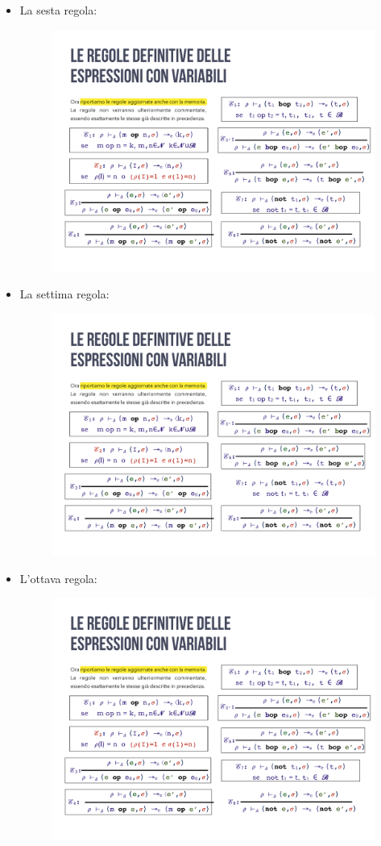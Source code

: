 \documentclass[a4paper]{article}
\begin{document}
\begin{itemize}
 		\item La sesta regola:
 		\begin{figure}[!htp]
 			\centering
 			\includegraphics[width=.7\textwidth]{img/regola_espressione-up-6.pdf}
 		\end{figure}
 		
 		\item La settima regola:
 		\begin{figure}[!htp]
 			\centering
 			\includegraphics[width=.7\textwidth]{img/regola_espressione-up-7.pdf}
 		\end{figure}
 		
 		\item L'ottava regola:
 		\begin{figure}[!htp]
 			\centering
 			\includegraphics[width=.7\textwidth]{img/regola_espressione-up-8.pdf}
 		\end{figure}
 	\end{itemize}\newpage
 	
\end{document}
